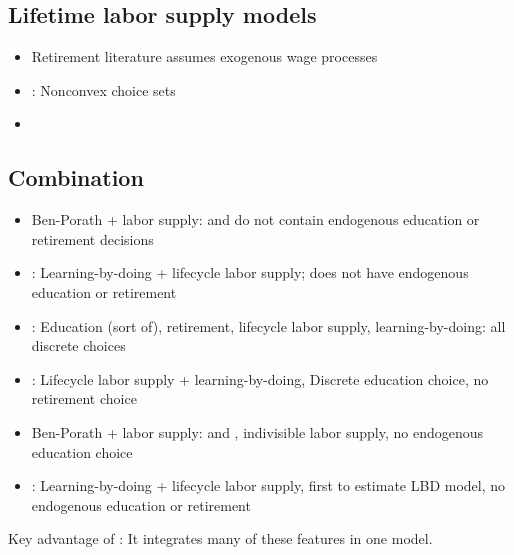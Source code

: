 \documentclass[12pt]{article}
\begin{document}
\subsection{Lifetime labor supply models}
\begin{itemize}
    \item Retirement literature assumes exogenous wage processes
    \item \textcite{rogerson_wallenius_2013_retirement_nonconvexities}: Nonconvex choice sets
    \item 
\end{itemize}

\subsection{Combination}
\begin{itemize}
    \item Ben-Porath + labor supply: \textcite{heckman_1976_lifecycle_human_capital_labor_supply} and \textcite{heckman_1976_estimate_human_capital_production_function} do not contain endogenous education or retirement decisions
    \item \textcite{imai_keane_2004_lifecycle_labor_supply_human_capital_accumulation}: Learning-by-doing + lifecycle labor supply; does not have endogenous education or retirement
    \item \textcite{keane_wolpin_1997_career_decisions_young_men}: Education (sort of), retirement, lifecycle labor supply, learning-by-doing: all discrete choices
    \item \textcite{blundell_costa-dias_meghir_shaw_2016_female_lifecycle_labor_supply_education_human_capital_welfare}: Lifecycle labor supply + learning-by-doing, Discrete education choice, no retirement choice
    \item Ben-Porath + labor supply: \textcite{manuelli_seshadri_shin_2012_lifetime_labor_supply_human_capital} and \textcite{fan_seshadri_taber_2012_lifetime_labor_supply_human_capital}, indivisible labor supply, no endogenous education choice
    \item \textcite{shaw_1989_lifecycle_labor_supply_human_capital}: Learning-by-doing + lifecycle labor supply, first to estimate LBD model, no endogenous education or retirement
\end{itemize}

Key advantage of \textcite{blinder_weiss_1976_lifecycle_human_capital_labor_supply_synthesis}: It integrates many of these features in one model.
\end{document}
